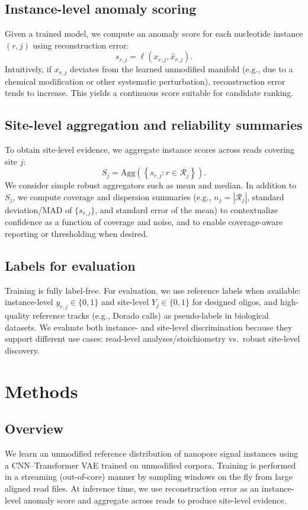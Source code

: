 \documentclass[journal,article,submit,pdftex,moreauthors]{Definitions/mdpi}
\begin{document}
\subsection{Instance-level anomaly scoring}
Given a trained model, we compute an anomaly score for each nucleotide instance $(r,j)$ using
reconstruction error:
\begin{equation}
s_{r,j} = \ell\!\left(x_{r,j}, \hat{x}_{r,j}\right).
\end{equation}
Intuitively, if $x_{r,j}$ deviates from the learned unmodified manifold (e.g., due to a chemical
modification or other systematic perturbation), reconstruction error tends to increase. This yields a
continuous score suitable for candidate ranking.

\subsection{Site-level aggregation and reliability summaries}
To obtain site-level evidence, we aggregate instance scores across reads covering site $j$:
\begin{equation}
S_j = \mathrm{Agg}\left(\left\{ s_{r,j} : r \in \mathcal{R}_j \right\}\right).
\end{equation}
We consider simple robust aggregators such as mean and median. In addition to $S_j$, we compute
coverage and dispersion summaries (e.g., $n_j = |\mathcal{R}_j|$, standard deviation/MAD of
$\{s_{r,j}\}$, and standard error of the mean) to contextualize confidence as a function of coverage
and noise, and to enable coverage-aware reporting or thresholding when desired.

\subsection{Labels for evaluation}
Training is fully label-free. For evaluation, we use reference labels when available:
instance-level $y_{r,j}\in\{0,1\}$ and site-level $Y_j\in\{0,1\}$ for designed oligos, and
high-quality reference tracks (e.g., Dorado calls) as pseudo-labels in biological datasets.
We evaluate both instance- and site-level discrimination because they support different use cases:
read-level analyses/stoichiometry vs.\ robust site-level discovery.

\section{Methods}
\subsection{Overview}
We learn an unmodified reference distribution of nanopore signal instances using a CNN--Transformer
VAE trained on unmodified corpora. Training is performed in a streaming (out-of-core) manner by
sampling windows on the fly from large aligned read files. At inference time, we use reconstruction
error as an instance-level anomaly score and aggregate across reads to produce site-level evidence.
\end{document}
